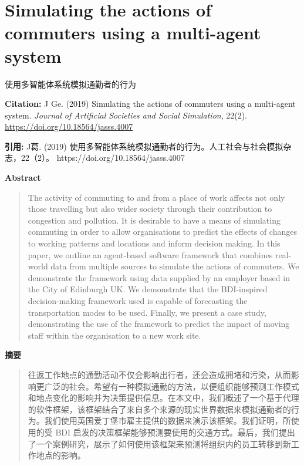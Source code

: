 \vspace{0.5em}
\chapter{Simulating the actions of commuters using a multi-agent system}
\begin{center}\small 使用多智能体系统模拟通勤者的行为\end{center}

\noindent\textbf{Citation:} J Ge. (2019) Simulating the actions of commuters using a multi-agent system. \textit{Journal of Artificial Societies and Social Simulation}, 22(2). \url{https://doi.org/10.18564/jasss.4007}

\vspace{0.5em}
\noindent\textbf{引用:} J葛. (2019) 使用多智能体系统模拟通勤者的行为。人工社会与社会模拟杂志，22（2）。 https://doi.org/10.18564/jasss.4007

\vspace{1.5em}
\noindent\textbf{Abstract}\par
\begin{quote}\small
The activity of commuting to and from a place of work affects not only those travelling but also wider society through their contribution to congestion and pollution. It is desirable to have a means of simulating commuting in order to allow organisations to predict the effects of changes to working patterns and locations and inform decision making. In this paper, we outline an agent-based software framework that combines real-world data from multiple sources to simulate the actions of commuters. We demonstrate the framework using data supplied by an employer based in the City of Edinburgh UK. We demonstrate that the BDI-inspired decision-making framework used is capable of forecasting the transportation modes to be used. Finally, we present a case study, demonstrating the use of the framework to predict the impact of moving staff within the organisation to a new work site.
\end{quote}

\noindent\textbf{摘要}\par
\begin{quote}\small
往返工作地点的通勤活动不仅会影响出行者，还会造成拥堵和污染，从而影响更广泛的社会。希望有一种模拟通勤的方法，以便组织能够预测工作模式和地点变化的影响并为决策提供信息。在本文中，我们概述了一个基于代理的软件框架，该框架结合了来自多个来源的现实世界数据来模拟通勤者的行为。我们使用英国爱丁堡市雇主提供的数据来演示该框架。我们证明，所使用的受 BDI 启发的决策框架能够预测要使用的交通方式。最后，我们提出了一个案例研究，展示了如何使用该框架来预测将组织内的员工转移到新工作地点的影响。
\end{quote}

